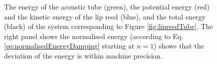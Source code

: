 \begin{figure}[h]
    \centering
      \caption{The energy of the acoustic tube (green), the potential energy (red) and the kinetic energy of the lip reed (blue), and the total energy (black) of the system corresponding to Figure \ref{fig:lipreedTube}. The right panel shows the normalised energy (according to Eq. \eqref{eq:normalisedEnergyDamping} starting at $n=1$) shows that the deviation of the energy is within machine precision. \label{fig:lipReedEnergy}}
\end{figure}